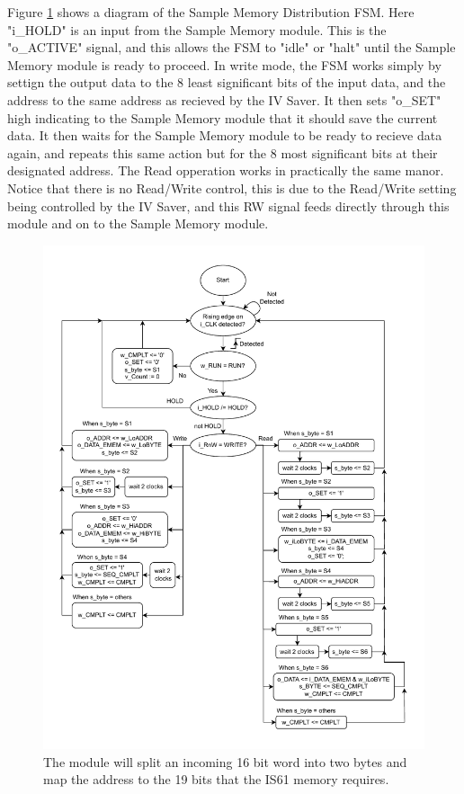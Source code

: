Figure \ref{fig:7_2_6_MemDist} shows a diagram of the Sample Memory Distribution FSM. Here "i\_HOLD" is an input from the Sample Memory module. This is the "o\_ACTIVE" signal, and this allows the FSM to "idle" or "halt" until the Sample Memory module is ready to proceed. In write mode, the FSM works simply by settign the output data to the 8 least significant bits of the input data, and the address to the same address as recieved by the IV Saver. It then sets "o\_SET" high indicating to the Sample Memory module that it should save the current data. It then waits for the Sample Memory module to be ready to recieve data again, and repeats this same action but for the 8 most significant bits at their designated address. The Read opperation works in practically the same manor. Notice that there is no Read/Write control, this is due to the Read/Write setting being controlled by the IV Saver, and this RW signal feeds directly through this module and on to the Sample Memory module.

\begin{figure}[H]
    \centering
    \includegraphics[clip, trim=0 0 0 0, width=1\textwidth]{Sections/7_SystemDesign/Figures/MDIST_FSM.pdf}
    \caption{The module will split an incoming 16 bit word into two bytes and map the address to the 19 bits that the IS61 memory requires.}
    \label{fig:7_2_6_MemDist}
\end{figure}

